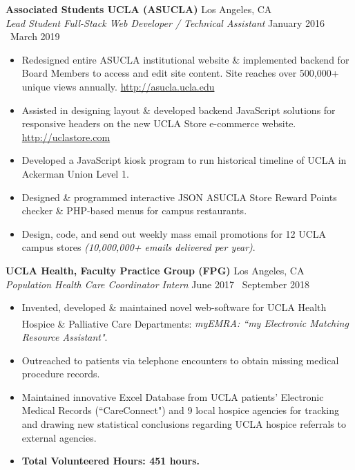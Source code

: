 \documentclass[margin]{res}
\begin{document}
\begin{resume}
		{\bf Associated Students UCLA (ASUCLA)} \hfill Los Angeles, CA \\
		{\it Lead Student Full-Stack Web Developer / Technical Assistant} \hfill January 2016 \textendash\ March 2019
		\begin{itemize} \itemsep -2pt
			\item Redesigned entire ASUCLA institutional website \& implemented backend for Board Members to access and edit site content. Site reaches over 500,000+ unique views annually. \textcolor{RoyalBlue}{\url{http://asucla.ucla.edu}}
			\item Assisted in designing layout \& developed backend JavaScript solutions for responsive headers on the new UCLA Store e-commerce website. \textcolor{RoyalBlue}{\url{http://uclastore.com}}
			\item Developed a JavaScript kiosk program to run historical timeline of UCLA in Ackerman Union Level 1.
			\item Designed \& programmed interactive JSON ASUCLA Store Reward Points checker \& PHP-based menus for campus restaurants.
			\item Design, code, and send out weekly mass email promotions for 12 UCLA campus stores {\it (10,000,000+ emails delivered per year)}.
		\end{itemize}
		
		{\bf UCLA Health, Faculty Practice Group (FPG)} \hfill Los Angeles, CA \\
		{\it Population Health Care Coordinator Intern} \hfill June 2017 \textendash\ September 2018
		\begin{itemize} \itemsep -2pt
			\item Invented, developed \& maintained novel web-software for UCLA Health Hospice \& Palliative Care Departments: {\it myEMRA\textsuperscript{\textregistered}: ``my Electronic Matching Resource Assistant"}.
			\item Outreached to patients via telephone encounters to obtain missing medical procedure records.
			\item Maintained innovative Excel Database from UCLA patients' Electronic Medical Records (``CareConnect") and 9 local hospice agencies for tracking and drawing new statistical conclusions regarding UCLA hospice referrals to external agencies.
			\item {\bf Total Volunteered Hours: 451 hours.}
		\end{itemize}
		

\end{resume}
\end{document}
